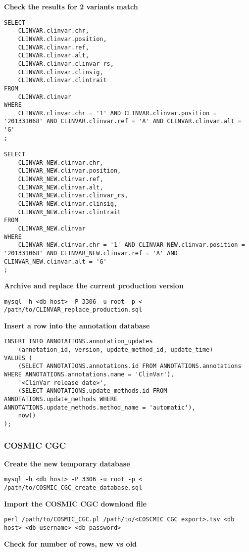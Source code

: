 \documentclass[11pt, a4paper]{article}
\begin{document}
\textbf{Check the results for 2 variants match}

\begin{lstlisting}
SELECT 
	CLINVAR.clinvar.chr,
	CLINVAR.clinvar.position,
	CLINVAR.clinvar.ref,
	CLINVAR.clinvar.alt,
	CLINVAR.clinvar.clinvar_rs,
	CLINVAR.clinvar.clinsig,
	CLINVAR.clinvar.clintrait
FROM 
	CLINVAR.clinvar 
WHERE 
	CLINVAR.clinvar.chr = '1' AND CLINVAR.clinvar.position = '201331068' AND CLINVAR.clinvar.ref = 'A' AND CLINVAR.clinvar.alt = 'G'
;

SELECT 
	CLINVAR_NEW.clinvar.chr,
	CLINVAR_NEW.clinvar.position,
	CLINVAR_NEW.clinvar.ref,
	CLINVAR_NEW.clinvar.alt,
	CLINVAR_NEW.clinvar.clinvar_rs,
	CLINVAR_NEW.clinvar.clinsig,
	CLINVAR_NEW.clinvar.clintrait
FROM 
	CLINVAR_NEW.clinvar 
WHERE 
	CLINVAR_NEW.clinvar.chr = '1' AND CLINVAR_NEW.clinvar.position = '201331068' AND CLINVAR_NEW.clinvar.ref = 'A' AND CLINVAR_NEW.clinvar.alt = 'G'
;
\end{lstlisting}

\textbf{Archive and replace the current production version}

\texttt{mysql -h <db host> -P 3306 -u root -p < /path/to/CLINVAR\_replace\_production.sql}

\textbf{Insert a row into the annotation database}

\begin{lstlisting}
INSERT INTO ANNOTATIONS.annotation_updates 
	(annotation_id, version, update_method_id, update_time)
VALUES (
	(SELECT ANNOTATIONS.annotations.id FROM ANNOTATIONS.annotations WHERE ANNOTATIONS.annotations.name = 'ClinVar'),
	'<ClinVar release date>',
	(SELECT ANNOTATIONS.update_methods.id FROM ANNOTATIONS.update_methods WHERE ANNOTATIONS.update_methods.method_name = 'automatic'),
	now()
);
\end{lstlisting}

\subsubsection{COSMIC CGC}

\textbf{Create the new temporary database}

\texttt{mysql -h <db host> -P 3306 -u root -p < /path/to/COSMIC\_CGC\_create\_database.sql}

\textbf{Import the COSMIC CGC download file}

\texttt{perl /path/to/COSMIC\_CGC.pl /path/to/<COSCMIC CGC export>.tsv <db host> <db username> <db password>}

\textbf{Check for number of rows, new vs old}
\end{document}
